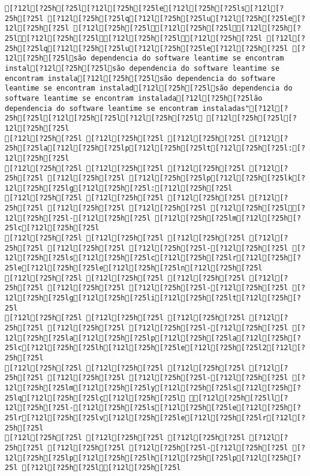 \documentclass{scrartcl}
\begin{document}
\begin{Verbatim}
[?12l[?25h[?25l[?12l[?25h[?25le[?12l[?25h[?25ls[?12l[?25h[?25l [?12l[?25h[?25lq[?12l[?25h[?25lu[?12l[?25h[?25le[?12l[?25h[?25l [?12l[?25h[?25l[?12l[?25h[?25l[?12l[?25h[?25l[?12l[?25h[?25l[?12l[?25h[?25l[?12l[?25h[?25l [?12l[?25h[?25lq[?12l[?25h[?25lu[?12l[?25h[?25le[?12l[?25h[?25l [?12l[?25h[?25lsão dependencia do software leantime se encontram instal[?12l[?25h[?25lsão dependencia do software leantime se encontram instala[?12l[?25h[?25lsão dependencia do software leantime se encontram instalad[?12l[?25h[?25lsão dependencia do software leantime se encontram instalada[?12l[?25h[?25lão dependencia do software leantime se encontram instaladas"[?12l[?25h[?25l[?12l[?25h[?25l[?12l[?25h[?25l [?12l[?25h[?25l[?12l[?25h[?25l
[?12l[?25h[?25l [?12l[?25h[?25l [?12l[?25h[?25l [?12l[?25h[?25la[?12l[?25h[?25lp[?12l[?25h[?25lt[?12l[?25h[?25l:[?12l[?25h[?25l
[?12l[?25h[?25l [?12l[?25h[?25l [?12l[?25h[?25l [?12l[?25h[?25l [?12l[?25h[?25l [?12l[?25h[?25lp[?12l[?25h[?25lk[?12l[?25h[?25lg[?12l[?25h[?25l:[?12l[?25h[?25l
[?12l[?25h[?25l [?12l[?25h[?25l [?12l[?25h[?25l [?12l[?25h[?25l [?12l[?25h[?25l [?12l[?25h[?25l [?12l[?25h[?25l[?12l[?25h[?25l-[?12l[?25h[?25l [?12l[?25h[?25lm[?12l[?25h[?25lc[?12l[?25h[?25l
[?12l[?25h[?25l [?12l[?25h[?25l [?12l[?25h[?25l [?12l[?25h[?25l [?12l[?25h[?25l [?12l[?25h[?25l-[?12l[?25h[?25l [?12l[?25h[?25ls[?12l[?25h[?25lc[?12l[?25h[?25lr[?12l[?25h[?25le[?12l[?25h[?25le[?12l[?25h[?25ln[?12l[?25h[?25l
[?12l[?25h[?25l [?12l[?25h[?25l [?12l[?25h[?25l [?12l[?25h[?25l [?12l[?25h[?25l [?12l[?25h[?25l-[?12l[?25h[?25l [?12l[?25h[?25lg[?12l[?25h[?25li[?12l[?25h[?25lt[?12l[?25h[?25l
[?12l[?25h[?25l [?12l[?25h[?25l [?12l[?25h[?25l [?12l[?25h[?25l [?12l[?25h[?25l [?12l[?25h[?25l-[?12l[?25h[?25l [?12l[?25h[?25la[?12l[?25h[?25lp[?12l[?25h[?25la[?12l[?25h[?25lc[?12l[?25h[?25lh[?12l[?25h[?25le[?12l[?25h[?25l2[?12l[?25h[?25l
[?12l[?25h[?25l [?12l[?25h[?25l [?12l[?25h[?25l [?12l[?25h[?25l [?12l[?25h[?25l [?12l[?25h[?25l-[?12l[?25h[?25l [?12l[?25h[?25lm[?12l[?25h[?25ly[?12l[?25h[?25ls[?12l[?25h[?25lq[?12l[?25h[?25lç[?12l[?25h[?25l [?12l[?25h[?25ll[?12l[?25h[?25l-[?12l[?25h[?25ls[?12l[?25h[?25le[?12l[?25h[?25lr[?12l[?25h[?25lv[?12l[?25h[?25le[?12l[?25h[?25lr[?12l[?25h[?25l
[?12l[?25h[?25l [?12l[?25h[?25l [?12l[?25h[?25l [?12l[?25h[?25l [?12l[?25h[?25l [?12l[?25h[?25l-[?12l[?25h[?25l [?12l[?25h[?25lp[?12l[?25h[?25lh[?12l[?25h[?25lp[?12l[?25h[?25l [?12l[?25h[?25l[?12l[?25h[?25l

\end{Verbatim}
\end{document}
